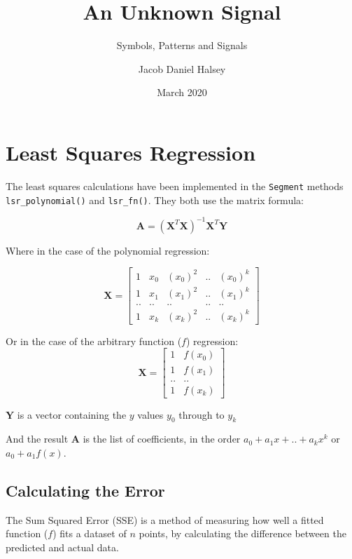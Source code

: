 \documentclass[11pt,a4paper]{scrartcl}
\title{An Unknown Signal}
\subtitle{Symbols, Patterns and Signals}
\author{Jacob Daniel Halsey}
\date{March 2020}
\begin{document}
	
\maketitle
	
\section{Least Squares Regression}

The least squares calculations have been implemented in the \lstinline|Segment| methods \lstinline|lsr_polynomial()| and \lstinline|lsr_fn()|.
They both use the matrix formula: \cite{wolfram_ls_poly}

\[\bm{A}=(\bm{X}^{T}\bm{X})^{-1}\bm{X}^{T}\bm{Y}\]

Where in the case of the polynomial regression:

\[
\bm{X} = \begin{bmatrix}
1 & x_{0} & \left (x_{0}  \right )^{2} & .. & \left (x_{0}  \right )^{k} \\ 
1 & x_{1} & \left (x_{1}  \right )^{2} & .. & \left (x_{1}  \right )^{k} \\ 
.. & .. & .. & .. & .. \\ 
1 & x_{k} & \left (x_{k}  \right )^{2} & .. & \left (x_{k}  \right )^{k}
\end{bmatrix}\]

Or in the case of the arbitrary function ($f$) regression:
\[
\bm{X} = 
\begin{bmatrix}
1 & f\left (x_{0}  \right ) \\ 
1 & f\left (x_{1}  \right ) \\ 
.. & .. \\ 
1 & f\left (x_{k}  \right )
\end{bmatrix}
\]

$\bm{Y}$ is a vector containing the $y$ values $y_{0}$ through to $y_{k}$

And the result $\bm{A}$ is the list of coefficients, in the order $a_{0} + a_{1}x + .. + a_{k}x^{k}$ or $a_{0} + a_{1}f(x)$.

\subsection*{Calculating the Error}

The Sum Squared Error (SSE) is a method of measuring how well a fitted function ($f$) fits a dataset of $n$ points, by calculating the difference between the predicted and actual data. \cite{wolfram_ls_fitting}
\end{document}
